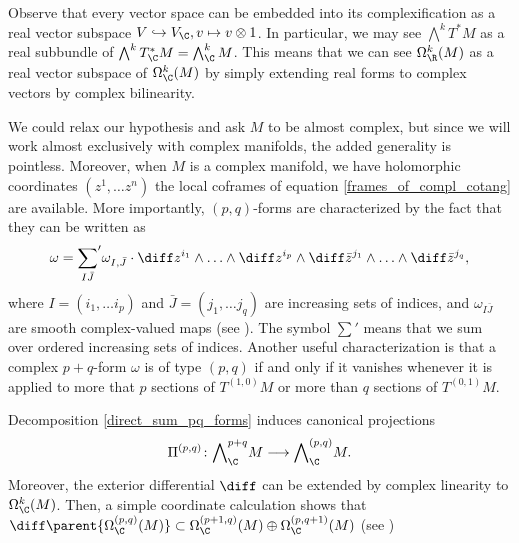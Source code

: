 Observe that every vector space can be embedded into its complexification as a real vector subspace \(V \hookrightarrow V_\C, v \mapsto v \otimes 1\). In particular, we may see \(\bigwedge^k T^*M\) as a real subbundle of \(\bigwedge^k T_\C^* M =\bigwedge^k_\C M\). This means that we can see \(\Omega_\R^k(M)\) as a real vector subspace of \(\Omega_\C^k(M)\) by simply extending real forms to complex vectors by complex bilinearity.
\begin{obs} \label{charac_pq_forms}
    We could relax our hypothesis and ask \(M\) to be almost complex, but since we will work almost exclusively with complex manifolds, the added generality is pointless. Moreover, when \(M\) is a complex manifold, we have holomorphic coordinates \((z^1, \ldots z^n)\) the local coframes of equation \eqref{frames_of_compl_cotang} are available. More importantly, \((p,q)\)-forms are characterized by the fact that they can be written as
    \begin{equation} \label{coordinates_complex_diff_form}
    \omega = {\sum_{I \bar{J}}}' \omega_{I, \bar{J}} \cdot \diff z^{i_1} \wedge \ldots \wedge \diff z^{i_p} \wedge \diff \bar{z}^{j_1} \wedge \ldots \wedge \diff \bar{z}^{j_q}, 
    \end{equation}
    where \(I=(i_1, \ldots i_p)\) and \(\bar{J}=(j_1, \ldots j_q)\) are increasing sets of indices, and \(\omega_{I \bar{J}}\) are smooth complex-valued maps (see \parencite[Lemma 4.1]{lee_introCM}). The symbol \(\sum'\) means that we sum over ordered increasing sets of indices. Another useful characterization is that a complex \(p+q\)-form \(\omega\) is of type \((p,q)\) if and only if it vanishes whenever it is applied to more that \(p\) sections of \(T^{(1,0)}M\) or more than \(q\) sections of \(T^{(0,1)}M\).
\end{obs}
Decomposition \eqref{direct_sum_pq_forms} induces canonical projections
\[
\Pi^{(p,q)} \colon {\bigwedge}^{p+q}_\C M \longrightarrow {\bigwedge}^{(p,q)}_\C M.
\]
Moreover, the exterior differential \(\diff\) can be extended by complex linearity to \(\Omega_\C^k(M)\). Then, a simple coordinate calculation shows that \(\diff \parent{\Omega_\C^{(p,q)}(M)} \subset \Omega_\C^{(p+1, q)}(M) \oplus \Omega_\C^{(p, q+1)}(M)\) (see \parencite[Prop. 4.5]{lee_introCM})

